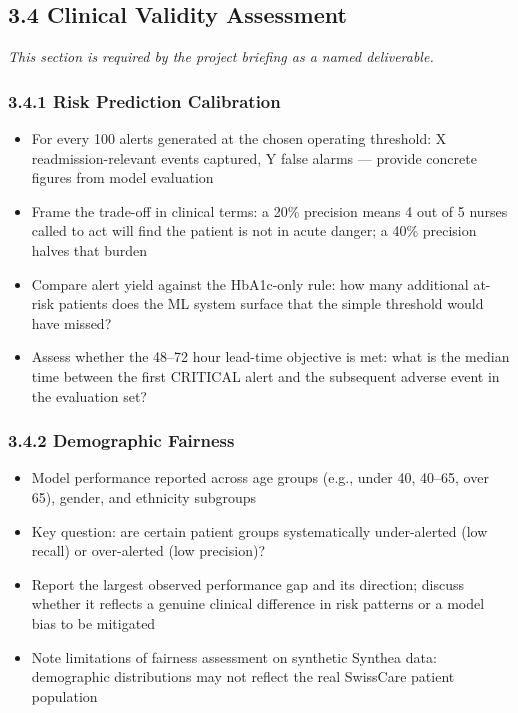 \documentclass[11pt,a4paper]{article}
\begin{document}
\subsection{3.4 Clinical Validity Assessment}

\emph{This section is required by the project briefing as a named deliverable.}

\subsubsection{3.4.1 Risk Prediction Calibration}
\begin{itemize}
\item For every 100 alerts generated at the chosen operating threshold: X readmission-relevant events captured, Y false alarms --- provide concrete figures from model evaluation
\item Frame the trade-off in clinical terms: a 20\% precision means 4 out of 5 nurses called to act will find the patient is not in acute danger; a 40\% precision halves that burden
\item Compare alert yield against the HbA1c-only rule: how many additional at-risk patients does the ML system surface that the simple threshold would have missed?
\item Assess whether the 48--72 hour lead-time objective is met: what is the median time between the first CRITICAL alert and the subsequent adverse event in the evaluation set?
\end{itemize}

\subsubsection{3.4.2 Demographic Fairness}
\begin{itemize}
\item Model performance reported across age groups (e.g., under 40, 40--65, over 65), gender, and ethnicity subgroups
\item Key question: are certain patient groups systematically under-alerted (low recall) or over-alerted (low precision)?
\item Report the largest observed performance gap and its direction; discuss whether it reflects a genuine clinical difference in risk patterns or a model bias to be mitigated
\item Note limitations of fairness assessment on synthetic Synthea data: demographic distributions may not reflect the real SwissCare patient population
\end{itemize}
\end{document}
